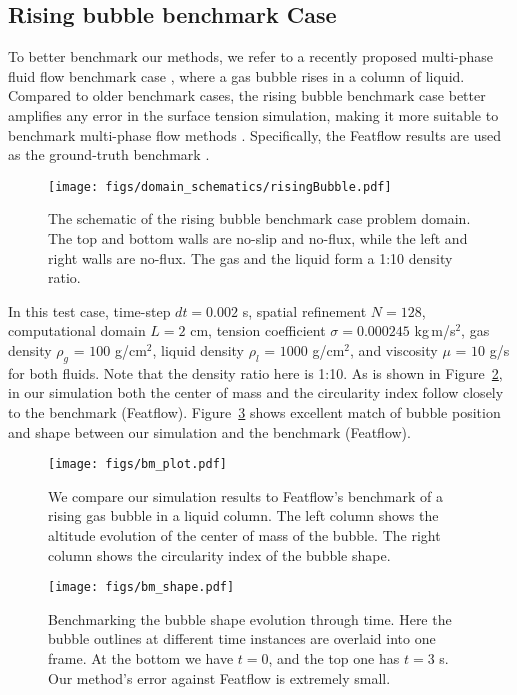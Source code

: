 \documentclass{jfm}
\begin{document}
\subsection {Rising bubble benchmark Case} \label{subsec:rb}
To better benchmark our methods, we refer to a recently proposed multi-phase fluid flow benchmark case \citep{rising_bubble}, where a gas bubble rises in a column of liquid. Compared to older benchmark cases, the rising bubble benchmark case better amplifies any error in the surface tension simulation, making it more suitable to benchmark multi-phase flow methods \citep{rising_bubble}. Specifically, the Featflow results are used as the ground-truth benchmark \citep{rising_bubble}. 

\begin{figure}
\centering
\texttt{[image: figs/domain\_schematics/risingBubble.pdf]}
\caption{The schematic of the rising bubble benchmark case problem domain. The top and bottom walls are no-slip and no-flux, while the left and right walls are no-flux. The gas and the liquid form a 1:10 density ratio.}
\label{fig:rb_domain}
\end{figure}

In this test case, time-step $dt=0.002$ s, spatial refinement $N=128$, computational domain $L=2$ cm, tension coefficient $\sigma=0.000245$ kg\,m/s$^2$, gas density $\rho_g$ = $100$ g/cm$^2$, liquid density $\rho_l$ = $1000$ g/cm$^2$, and viscosity $\mu$ = $10$ g/s for both fluids. Note that the density ratio here is 1:10. As is shown in Figure~\ref{fig:bm_plot}, in our simulation both the center of mass and the circularity index follow closely to the benchmark (Featflow). Figure~\ref{fig:bm_shape} shows excellent match of bubble position and shape between our simulation and the benchmark (Featflow). 

\begin{figure}
\centering
\texttt{[image: figs/bm\_plot.pdf]}
\caption{We compare our simulation results to Featflow's benchmark \citep{rising_bubble} of a rising gas bubble in a liquid column. The left column shows the altitude evolution of the center of mass of the bubble. The right column shows the circularity index of the bubble shape.}
\label{fig:bm_plot}
\end{figure}
\begin{figure}
\centering
\texttt{[image: figs/bm\_shape.pdf]}
\caption{Benchmarking the bubble shape evolution through time. Here the bubble outlines at different time instances are overlaid into one frame. At the bottom we have $t = 0$, and the top one has $t = 3$ s. Our method's error against Featflow \citep{rising_bubble} is extremely small. }
\label{fig:bm_shape}
\end{figure}
\end{document}
